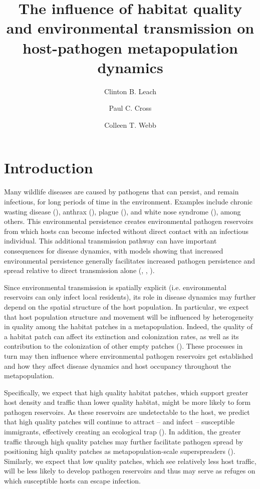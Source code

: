 \documentclass{svjour3}
\begin{document}
\title{The influence of habitat quality and environmental transmission on host-pathogen metapopulation dynamics}

\author{Clinton B. Leach \and Paul C. Cross \and Colleen T. Webb}




\maketitle

\section{Introduction}
\label{intro}

Many wildlife diseases are caused by pathogens that can persist, and remain infectious, for long periods of time in the environment.  Examples include chronic wasting disease (\cite{Miller2006}), anthrax (\cite{Dragon1995}), plague (\cite{Eisen2008}), and white nose syndrome (\cite{Lindner2011}), among others.  This environmental persistence creates environmental pathogen reservoirs from which hosts can become infected without direct contact with an infectious individual.  This additional transmission pathway can have important consequences for disease dynamics, with models showing that increased environmental persistence generally facilitates increased pathogen persistence and spread relative to direct transmission alone (\cite{Almberg2011}, \cite{Sharp2011}, \cite{Breban2009}). 

Since environmental transmission is spatially explicit (i.e. environmental reservoirs can only infect local residents), its role in disease dynamics may further depend on the spatial structure of the host population.  In particular, we expect that host population structure and movement will be influenced by heterogeneity in quality among the habitat patches in a metapopulation.  Indeed, the quality of a habitat patch can affect its extinction and colonization rates, as well as its contribution to the colonization of other empty patches (\cite{Moilanen1998}).  These processes in turn may then influence where environmental pathogen reservoirs get established and how they affect disease dynamics and host occupancy throughout the metapopulation.  

Specifically, we expect that high quality habitat patches, which support greater host density and traffic than lower quality habitat, might be more likely to form pathogen reservoirs.  As these reservoirs are undetectable to the host, we predict that high quality patches will continue to attract -- and infect -- susceptible immigrants, effectively creating an ecological trap (\cite{Almberg2011}).  In addition, the greater traffic through high quality patches may further facilitate pathogen spread by positioning high quality patches as metapopulation-scale superspreaders (\cite{Paull2012}).  Similarly, we expect that low quality patches, which see relatively less host traffic, will be less likely to develop pathogen reservoirs and thus may serve as refuges on which susceptible hosts can escape infection.  
\end{document}
